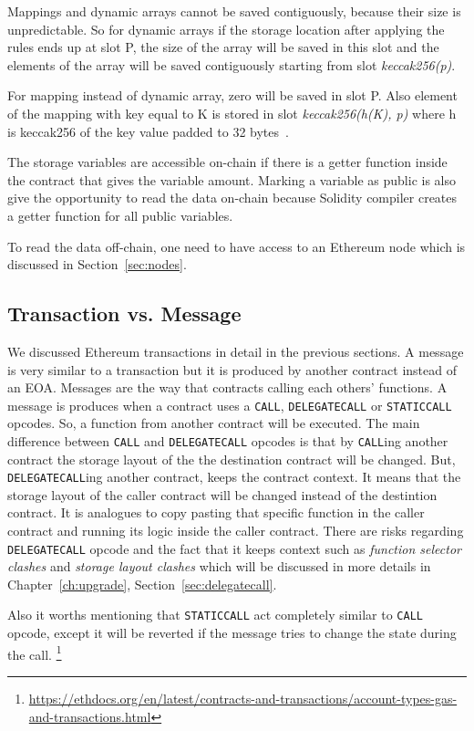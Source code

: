 Mappings and dynamic arrays cannot be saved contiguously, because their size is unpredictable. So for dynamic arrays if the storage location after applying the rules ends up at slot P, the size of the array will be saved in this slot and the elements of the array will be saved contiguously starting from slot \textit{keccak256(p)}.

For mapping instead of dynamic array, zero will be saved in slot P. Also element of the mapping with key equal to K is stored in slot \textit{keccak256(h(K), p)} where h is keccak256 of the key value padded to 32 bytes~\cite{wood2014ethereum}.

The storage variables are accessible on-chain if there is a getter function inside the contract that gives the variable amount. Marking a variable as public is also give the opportunity to read the data on-chain because Solidity compiler creates a getter function for all public variables. 

To read the data off-chain, one need to have access to an Ethereum node which is discussed in Section~\ref{sec:nodes}.


\subsection{Transaction vs. Message}\label{sec:txVsMsg}
We discussed Ethereum transactions in detail in the previous sections. A message is very similar to a transaction but it is produced by another contract instead of an EOA. Messages are the way that contracts calling each others' functions. A message is produces when a contract uses a \texttt{CALL}, \texttt{DELEGATECALL} or \texttt{STATICCALL} opcodes. So, a function from another contract will be executed. The main difference between \texttt{CALL} and \texttt{DELEGATECALL} opcodes is that by \texttt{CALL}ing another contract the storage layout of the the destination contract will be changed. But, \texttt{DELEGATECALL}ing another contract, keeps the contract context. It means that the storage layout of the caller contract will be changed instead of the destintion contract. It is analogues to copy pasting that specific function in the caller contract and running its logic inside the caller contract. There are risks regarding \texttt{DELEGATECALL} opcode and the fact that it keeps context such as \textit{function selector clashes} and \textit{storage layout clashes} which will be discussed in more details in Chapter~\ref{ch:upgrade}, Section~\ref{sec:delegatecall}.

Also it worths mentioning that \texttt{STATICCALL} act completely similar to \texttt{CALL} opcode, except it will be reverted if the message tries to change the state during the call. 
\footnote{\url{https://ethdocs.org/en/latest/contracts-and-transactions/account-types-gas-and-transactions.html}}


